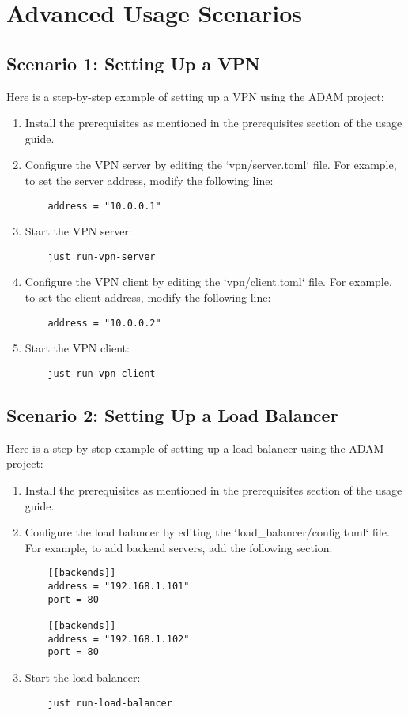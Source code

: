 \documentclass{article}
\begin{document}
\section{Advanced Usage Scenarios}
\subsection{Scenario 1: Setting Up a VPN}
Here is a step-by-step example of setting up a VPN using the ADAM project:
\begin{enumerate}
    \item Install the prerequisites as mentioned in the prerequisites section of the usage guide.
    \item Configure the VPN server by editing the `vpn/server.toml` file. For example, to set the server address, modify the following line:
    \begin{verbatim}
    address = "10.0.0.1"
    \end{verbatim}
    \item Start the VPN server:
    \begin{verbatim}
    just run-vpn-server
    \end{verbatim}
    \item Configure the VPN client by editing the `vpn/client.toml` file. For example, to set the client address, modify the following line:
    \begin{verbatim}
    address = "10.0.0.2"
    \end{verbatim}
    \item Start the VPN client:
    \begin{verbatim}
    just run-vpn-client
    \end{verbatim}
\end{enumerate}

\subsection{Scenario 2: Setting Up a Load Balancer}
Here is a step-by-step example of setting up a load balancer using the ADAM project:
\begin{enumerate}
    \item Install the prerequisites as mentioned in the prerequisites section of the usage guide.
    \item Configure the load balancer by editing the `load_balancer/config.toml` file. For example, to add backend servers, add the following section:
    \begin{verbatim}
    [[backends]]
    address = "192.168.1.101"
    port = 80

    [[backends]]
    address = "192.168.1.102"
    port = 80
    \end{verbatim}
    \item Start the load balancer:
    \begin{verbatim}
    just run-load-balancer
    \end{verbatim}
\end{enumerate}
\end{document}
